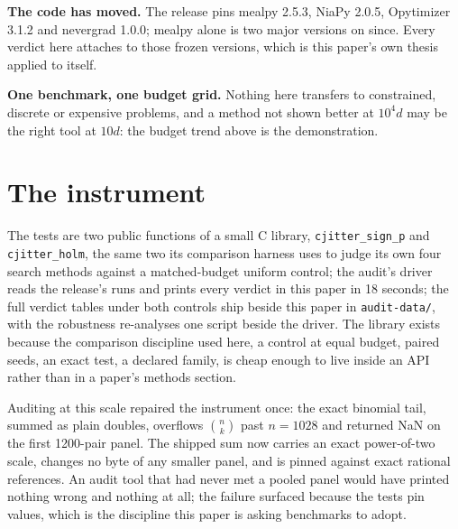 \documentclass[11pt]{article}
\begin{document}
\textbf{The code has moved.} The release pins mealpy 2.5.3, NiaPy 2.0.5, Opytimizer
3.1.2 and nevergrad 1.0.0; mealpy alone is two major versions on since. Every verdict
here attaches to those frozen versions, which is this paper's own thesis applied to
itself.

\textbf{One benchmark, one budget grid.} Nothing here transfers to constrained, discrete
or expensive problems, and a method not shown better at $10^4 d$ may be the right tool
at $10 d$: the budget trend above is the demonstration.

\section{The instrument}

The tests are two public functions of a small C library, \texttt{cjitter\_sign\_p} and
\texttt{cjitter\_holm}, the same two its comparison harness uses to judge its own four
search methods against a matched-budget uniform control; the audit's driver reads the
release's runs and prints every verdict in this paper in 18 seconds; the full verdict
tables under both controls ship beside this paper in \texttt{audit-data/}, with the
robustness re-analyses one script beside the driver. The library exists
because the comparison discipline used here, a control at equal budget, paired seeds,
an exact test, a declared family, is cheap enough to live inside an API rather than in a
paper's methods section.

Auditing at this scale repaired the instrument once: the exact binomial tail, summed as
plain doubles, overflows $\binom{n}{k}$ past $n = 1028$ and returned NaN on the first
1200-pair panel. The shipped sum now carries an exact power-of-two scale, changes no
byte of any smaller panel, and is pinned against exact rational references. An audit
tool that had never met a pooled panel would have printed nothing wrong and nothing at
all; the failure surfaced because the tests pin values, which is the discipline this
paper is asking benchmarks to adopt.
\end{document}

